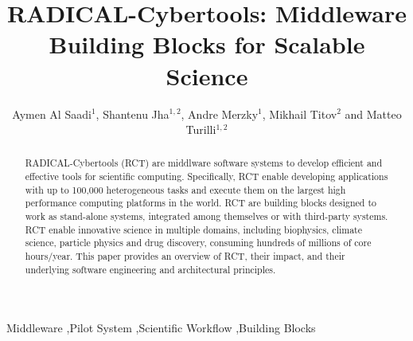 \documentclass[preprint,12pt, a4paper]{elsarticle}
\begin{document}
\begin{frontmatter}

\title{RADICAL-Cybertools: Middleware Building Blocks for Scalable Science}

\author{Aymen Al Saadi$^1$, Shantenu Jha$^{1,2}$, Andre Merzky$^1$, Mikhail Titov$^2$ and Matteo Turilli$^{1,2}$}
\address{$^1$Electrical \& Computer Engineering, Rutgers University, Piscataway, NJ 08854, USA, $^2$Brookhaven National Laboratory}

\begin{abstract}
RADICAL-Cybertools (RCT) are middlware software systems to develop efficient and
effective tools for scientific computing. Specifically, RCT enable developing
applications with up to 100,000 heterogeneous tasks and execute them on the
largest high performance computing platforms in the world. RCT are building
blocks designed to work as stand-alone systems, integrated among themselves or
with third-party systems. RCT enable innovative science in multiple domains,
including biophysics, climate science, particle physics and drug discovery,
consuming hundreds of millions of core hours/year. This paper provides an
overview of RCT, their impact, and their underlying software engineering and
architectural principles.
\end{abstract}

\begin{keyword}

Middleware \sep Pilot System \sep Scientific Workflow \sep Building Blocks



\end{keyword}

\end{frontmatter}


\end{document}
